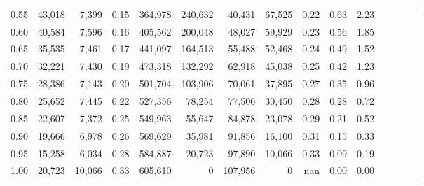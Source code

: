 \begin{tabular}{rrrcrrrrrrrrrrr}
0.55 &  43,018 &   7,399 &                                       0.15 &  364,978 &  240,632 &   40,431 &   67,525 &  0.22 &  0.63 &                         2.23 \\
0.60 &  40,584 &   7,596 &                                       0.16 &  405,562 &  200,048 &   48,027 &   59,929 &  0.23 &  0.56 &                         1.85 \\
0.65 &  35,535 &   7,461 &                                       0.17 &  441,097 &  164,513 &   55,488 &   52,468 &  0.24 &  0.49 &                         1.52 \\
0.70 &  32,221 &   7,430 &                                       0.19 &  473,318 &  132,292 &   62,918 &   45,038 &  0.25 &  0.42 &                         1.23 \\
0.75 &  28,386 &   7,143 &                                       0.20 &  501,704 &  103,906 &   70,061 &   37,895 &  0.27 &  0.35 &                         0.96 \\
0.80 &  25,652 &   7,445 &                                       0.22 &  527,356 &   78,254 &   77,506 &   30,450 &  0.28 &  0.28 &                         0.72 \\
0.85 &  22,607 &   7,372 &                                       0.25 &  549,963 &   55,647 &   84,878 &   23,078 &  0.29 &  0.21 &                         0.52 \\
0.90 &  19,666 &   6,978 &                                       0.26 &  569,629 &   35,981 &   91,856 &   16,100 &  0.31 &  0.15 &                         0.33 \\
0.95 &  15,258 &   6,034 &                                       0.28 &  584,887 &   20,723 &   97,890 &   10,066 &  0.33 &  0.09 &                         0.19 \\
1.00 &  20,723 &  10,066 &                                       0.33 &  605,610 &        0 &  107,956 &        0 &   nan &  0.00 &                         0.00 \\
\bottomrule
\end{tabular}
